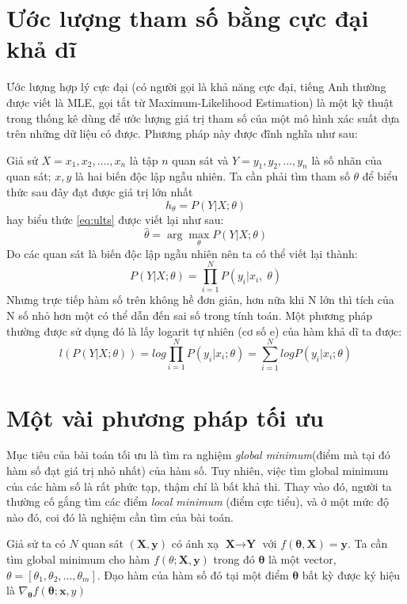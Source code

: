\section{Ước lượng tham số bằng cực đại khả dĩ}
Ước lượng hợp lý cực đại (có người gọi là khả năng cực đại, tiếng Anh thường được viết là MLE, gọi tắt từ Maximum-Likelihood Estimation) là một kỹ thuật trong thống kê dùng để ước lượng giá trị tham số của một mô hình xác suất dựa trên những dữ liệu có được. Phương pháp này được đĩnh nghĩa như sau:\par
Giả sử $X=x_1,x_2,....,x_n$ là tập $n$ quan sát và $Y=y_1,y_2,...,y_n$ là số nhãn của quan sát; $x,y$ là hai biến độc lập ngẫu nhiên. Ta cần phải tìm tham số $\theta$ để biểu thức sau đây đạt được giá trị lớn nhất
\begin{equation}
\label{eq:ults}
h_{\theta} = P(Y|X;\theta)
\end{equation} 
hay biểu thức \ref{eq:ults} được viết lại như sau:
\begin{equation}
\widehat{\theta} = \arg\max_{\theta}P(Y|X;\theta)
\end{equation}
Do các quan sát là biến độc lập ngẫu nhiên nên ta có thể viết lại thành:
\begin{equation}
P(Y|X;\theta) = \prod^N_{i=1}P(y_i|x_i,\;\theta)
\end{equation}
Nhưng trực tiếp hàm số trên không hề đơn giản, hơn nữa khi N lớn thì tích của N số nhỏ hơn một có thể dẫn đến sai số trong tính toán. Một phương pháp thường được sử dụng đó là lấy logarit	tự nhiên (cơ số e) của hàm khả dĩ ta được:
\begin{equation}
l(P(Y|X;\theta)) = log\prod_{i=1}^N P(y_i|x_i;\theta)=\sum_{i=1}^NlogP(y_i|x_i;\theta)
\end{equation}
\section{Một vài phương pháp tối ưu}
Mục tiêu của bài toán tối ưu là tìm ra nghiệm \textit{global minimum}(điểm mà tại đó hàm số đạt giá trị nhỏ nhất) của hàm số.  Tuy nhiên, việc tìm global minimum của các hàm số là rất phức tạp, thậm chí là bất khả thi. Thay vào đó, người ta thường cố gắng tìm các điểm \textit{local minimum} (điểm cực tiểu), và ở một mức độ nào đó, coi đó là nghiệm cần tìm của bài toán.\par
Giả sử ta có $N$ quan sát $(\textbf{X},\textbf{y})$ có ánh xạ $\textbf{X} \to \textbf{Y}$ với $f(\mathbf{\theta},\textbf{X})=\textbf{y}$. Ta cần tìm global minimum cho hàm $f(\theta;\textbf{X},\textbf{y})$ trong đó $\mathbf{\theta}$ là một vector, $\theta=[\theta_1,\theta_2,...,\theta_m]$. Đạo hàm của hàm số đó tại một điểm   $\mathbf{\theta}$ bất kỳ được ký hiệu là $\nabla_\mathbf{\theta} f(\mathbf{\theta};\textbf{x},y)$
